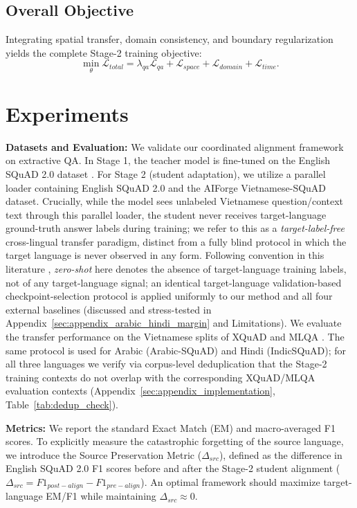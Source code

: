 \documentclass[11pt]{article}
\begin{document}
\subsection{Overall Objective}
\label{sec:overall_obj}
Integrating spatial transfer, domain consistency, and boundary regularization yields the complete Stage-2 training objective:
$$ \min_\theta \mathcal{L}_{total} = \lambda_{qa}\mathcal{L}_{qa} + \mathcal{L}_{space} + \mathcal{L}_{domain} + \mathcal{L}_{time}. $$

\section{Experiments}
\label{sec:setup}

\textbf{Datasets and Evaluation:} We validate our coordinated alignment framework on extractive QA. In Stage 1, the teacher model is fine-tuned on the English SQuAD 2.0 dataset \citep{rajpurkar-etal-2018-know}. For Stage 2 (student adaptation), we utilize a parallel loader containing English SQuAD 2.0 and the AIForge Vietnamese-SQuAD dataset. Crucially, while the model sees unlabeled Vietnamese question/context text through this parallel loader, the student never receives target-language ground-truth answer labels during training; we refer to this as a \emph{target-label-free} cross-lingual transfer paradigm, distinct from a fully blind protocol in which the target language is never observed in any form. Following convention in this literature \citep{artetxe-etal-2020-cross, pfeiffer-etal-2020-mad}, \emph{zero-shot} here denotes the absence of target-language training labels, not of any target-language signal; an identical target-language validation-based checkpoint-selection protocol is applied uniformly to our method and all four external baselines (discussed and stress-tested in Appendix~\ref{sec:appendix_arabic_hindi_margin} and Limitations). We evaluate the transfer performance on the Vietnamese splits of XQuAD \citep{artetxe-etal-2020-cross} and MLQA \citep{lewis-etal-2020-mlqa}. The same protocol is used for Arabic (Arabic-SQuAD) and Hindi (IndicSQuAD); for all three languages we verify via corpus-level deduplication that the Stage-2 training contexts do not overlap with the corresponding XQuAD/MLQA evaluation contexts (Appendix~\ref{sec:appendix_implementation}, Table~\ref{tab:dedup_check}).

\textbf{Metrics:} We report the standard Exact Match (EM) and macro-averaged F1 scores. To explicitly measure the catastrophic forgetting of the source language, we introduce the Source Preservation Metric ($\Delta_{src}$), defined as the difference in English SQuAD 2.0 F1 scores before and after the Stage-2 student alignment ($\Delta_{src} = F1_{post-align} - F1_{pre-align}$). An optimal framework should maximize target-language EM/F1 while maintaining $\Delta_{src} \approx 0$.
\end{document}
